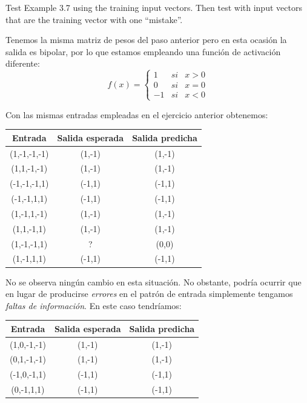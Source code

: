 \begin{problem}[5]
Test Example 3.7 using the training input vectors. Then test with input vectors that
are the training vector with one ``mistake''.
\solution

Tenemos la misma matriz de pesos del paso anterior pero en esta ocasión la salida es bipolar, por lo que estamos empleando una función de activación diferente:
\[f(x) = \left\{ \begin{array}{lll} 1 & si & x>0 \\ 0 & si & x=0 \\ -1 & si & x< 0 \end{array}\right. \]

Con las mismas entradas empleadas en el ejercicio anterior obtenemos:
\begin{center}
\begin{tabular}{|c|c|c|}
\hline
\textbf{Entrada } & \textbf{Salida esperada} & \textbf{Salida predicha} \\
\hline
(1,-1,-1,-1) & (1,-1) & (1,-1) \\
(1,1,-1,-1)  & (1,-1) & (1,-1) \\
(-1,-1,-1,1) & (-1,1) & (-1,1) \\
(-1,-1,1,1)  & (-1,1) & (-1,1) \\
(1,-1,1,-1)  & (1,-1) & (1,-1) \\
(1,1,-1,1)   & (1,-1) & (1,-1) \\
(1,-1,-1,1)  & ?      & (0,0)  \\
(1,-1,1,1)   & (-1,1) & (-1,1) \\
\hline
\end{tabular}
\end{center}

No se observa ningún cambio en esta situación. No obstante, podría ocurrir que en lugar de producirse \emph{errores} en el patrón de entrada simplemente tengamos \emph{faltas de información}. En este caso tendríamos:
\begin{center}
\begin{tabular}{|c|c|c|}
\hline
\textbf{Entrada } & \textbf{Salida esperada} & \textbf{Salida predicha} \\
\hline
(1,0,-1,-1) & (1,-1)  & (1,-1) \\
(0,1,-1,-1)  & (1,-1) & (1,-1) \\
(-1,0,-1,1) & (-1,1)  & (-1,1) \\
(0,-1,1,1)  & (-1,1)  & (-1,1) \\
\hline
\end{tabular}
\end{center}
\end{problem}


